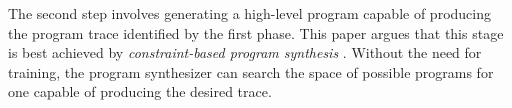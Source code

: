 \documentclass{article}
\begin{document}
The second step involves generating a high-level program capable of producing the program trace identified by the first phase.
This paper argues that this stage is best achieved by \emph{constraint-based program synthesis} \cite{solar2008program}. Without the need for training, the program synthesizer can search the space of possible programs for one capable of producing the desired trace.


\end{document}
